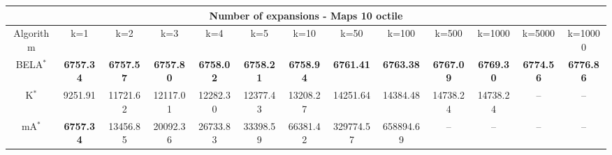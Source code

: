 \begin{tabular}{c|cccccccccccc}\toprule
\multicolumn{13}{c}{Number of expansions - Maps 10 octile}\\ \midrule
Algorithm & k=1 & k=2 & k=3 & k=4 & k=5 & k=10 & k=50 & k=100 & k=500 & k=1000 & k=5000 & k=10000 \\ \midrule
BELA$^*$ & \textbf{6757.34} & \textbf{6757.57} & \textbf{6757.80} & \textbf{6758.02} & \textbf{6758.21} & \textbf{6758.94} & \textbf{6761.41} & \textbf{6763.38} & \textbf{6767.09} & \textbf{6769.30} & \textbf{6774.56} & \textbf{6776.86} \\
K$^*$ & 9251.91 & 11721.62 & 12117.01 & 12282.30 & 12377.43 & 13208.27 & 14251.64 & 14384.48 & 14738.24 & 14738.24 & -- & -- \\
mA$^*$ & \textbf{6757.34} & 13456.85 & 20092.36 & 26733.83 & 33398.59 & 66381.42 & 329774.57 & 658894.69 & -- & -- & -- & -- \\ \bottomrule 
\end{tabular}
